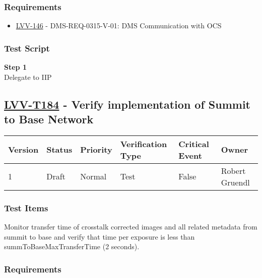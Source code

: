 \subsubsection{Requirements}\label{requirements-42}

\begin{itemize}
\tightlist
\item
  \href{https://jira.lsstcorp.org/browse/LVV-146}{LVV-146} -
  DMS-REQ-0315-V-01: DMS Communication with OCS
\end{itemize}

\subsubsection{Test Script}\label{test-script-42}

\textbf{Step 1}\\
Delegate to IIP\\[2\baselineskip]

\hypertarget{lvv-t184---verify-implementation-of-summit-to-base-network}{\subsection{\texorpdfstring{\href{https://jira.lsstcorp.org/secure/Tests.jspa\#/testCase/LVV-T184}{LVV-T184}
- Verify implementation of Summit to Base
Network}{LVV-T184 - Verify implementation of Summit to Base Network}}\label{lvv-t184---verify-implementation-of-summit-to-base-network}}

\begin{longtable}[]{@{}llllll@{}}
\toprule
Version & Status & Priority & Verification Type & Critical Event &
Owner\tabularnewline
\midrule
\endhead
1 & Draft & Normal & Test & False & Robert Gruendl\tabularnewline
\bottomrule
\end{longtable}

\subsubsection{Test Items}\label{test-items-43}

Monitor transfer time of crosstalk corrected images and all related
metadata from summit to base and verify that time per exposure is less
than summToBaseMaxTransferTime (2 seconds).

\subsubsection{Requirements}\label{requirements-43}

